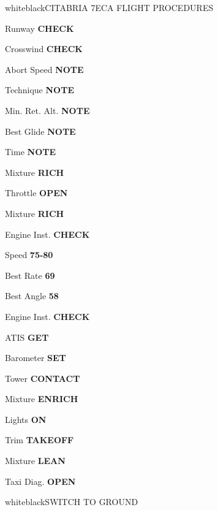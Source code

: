 \documentclass{article}
\begin{document}
\begin{groupheading}{white}{black}{CITABRIA 7ECA FLIGHT PROCEDURES}
\end{groupheading}
\begin{multicols*}{3}

\colorbox{green!80!red}{}

Runway \dotfill \textbf{CHECK}

Crosswind \dotfill \textbf{CHECK}

Abort Speed \dotfill \textbf{NOTE}

Technique \dotfill \textbf{NOTE}

Min. Ret. Alt. \dotfill \textbf{NOTE}

Best Glide \dotfill \textbf{NOTE}

Time \dotfill \textbf{NOTE}

Mixture \dotfill \textbf{RICH}

\colorbox{green!80!red}{}

Throttle \dotfill \textbf{OPEN}

\colorbox{orange!80}{}

Mixture \dotfill \textbf{RICH}

Engine Inst. \dotfill \textbf{CHECK}

Speed \dotfill \textbf{75-80}

Best Rate \dotfill \textbf{69}

Best Angle \dotfill \textbf{58}

\colorbox{green!80!red}{}

Engine Inst. \dotfill \textbf{CHECK}

ATIS \dotfill \textbf{GET}

Barometer \dotfill \textbf{SET}

Tower \dotfill \textbf{CONTACT}

Mixture \dotfill \textbf{ENRICH}

Lights \dotfill \textbf{ON}

\colorbox{green!80!red}{}

Trim \dotfill \textbf{TAKEOFF}

Mixture \dotfill \textbf{LEAN}

Taxi Diag. \dotfill \textbf{OPEN} \\

\begin{groupheading}{white}{black}{SWITCH TO GROUND}
\end{groupheading}


\end{multicols*}
\end{document}
